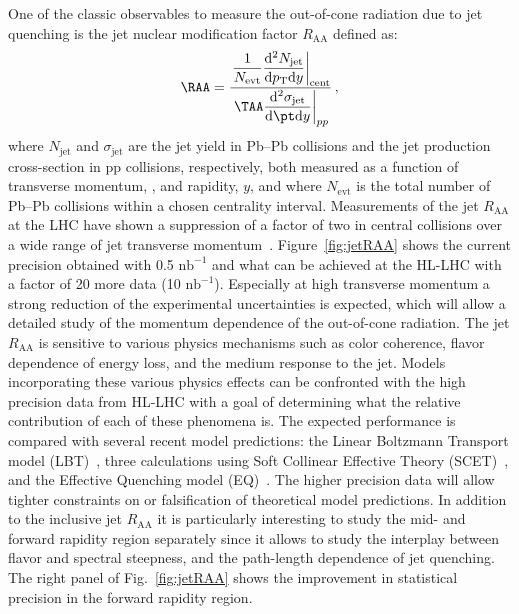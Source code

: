One of the classic observables to measure the out-of-cone radiation due to jet quenching is the jet nuclear modification factor $R_{\mathrm{AA}}$ defined as: 
  \begin{equation} 
  \RAA=\dfrac{ \left.\dfrac{1}{N_{\mathrm{evt}} }\dfrac{\mathrm{d}^{2} 
N_{\mathrm{jet}}}{\mathrm{d} \pT \mathrm{d} y} \right|_{\mathrm{cent}}
}
{
\left. \TAA \dfrac{\mathrm{d}^2 \sigma_{\mathrm{jet}}}{\mathrm{d} \pt \mathrm{d} y}\right|_{pp}
}\, ,
\label{eq:RAAjet}
\end{equation} 
where $N_{\mathrm{jet}}$ and $\sigma_{\mathrm{jet}}$ are the jet yield in Pb--Pb collisions and the jet production cross-section in pp collisions, 
respectively, both measured as a function of transverse momentum, \pT, and rapidity, $y$, and where $N_{\mathrm{evt}}$ is the total number of Pb--Pb collisions within a chosen centrality interval. 
Measurements of the jet $R_{\mathrm{AA}}$ at the LHC have shown a suppression of a factor of two in central collisions over a wide range of jet transverse momentum~\cite{Aad:2012vca,Abelev:2013kqa,Khachatryan:2016jfl}. Figure~\ref{fig:jetRAA} shows the current precision obtained with 0.5 $\mathrm{nb}^{-1}$ and what can be achieved at the HL-LHC with a factor of 20 more data (10 $\mathrm{nb}^{-1}$). Especially at high transverse momentum a strong reduction of the experimental uncertainties is expected, which will allow a detailed study of the momentum dependence of the out-of-cone radiation. The jet $R_{\mathrm{AA}}$ is sensitive to various physics mechanisms such as color coherence, flavor dependence of energy loss, and the medium response to the jet. Models incorporating these various physics effects can be confronted with the high precision data from HL-LHC with a goal of determining what the relative contribution of each of these phenomena is. The expected performance is compared with several recent model predictions: the Linear Boltzmann Transport model (LBT)~\cite{He:2015pra}, three calculations using Soft Collinear Effective Theory (SCET)~\cite{Chien:2015vja,Chien:2015hda,Vitev:2008rz,Kang:2017frl}, and the Effective Quenching model (EQ)~\cite{Spousta:2015fca}. The higher precision data will allow tighter constraints on or falsification of theoretical model predictions. In addition to the inclusive jet $R_{\mathrm{AA}}$ it is particularly interesting to study the mid- and forward rapidity region separately since it allows to study the interplay between flavor and spectral steepness, and the path-length dependence of jet quenching. 
The right panel of Fig.~\ref{fig:jetRAA} shows the improvement in statistical precision in the forward rapidity region. 
